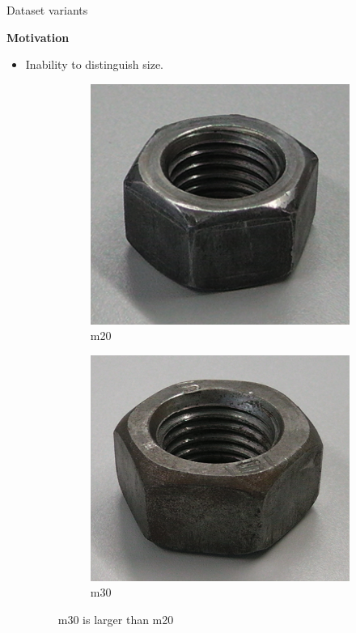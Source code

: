 \documentclass{beamer}
\begin{document}
\begin{frame}{Dataset variants}
\label{slide:motivvariants}

	\textbf{Motivation}
	\begin{small}
	
		\begin{itemize}
			\item Inability to distinguish size.
				\begin{figure}
				\centering
				\begin{subfigure}{.2\textwidth}
  					\centering
  					\includegraphics[width=.35\linewidth]{images/M20}
  					\caption{m20 \cite{github_robocup@work}}
  					\label{Fig:size1}
				\end{subfigure}%
				\begin{subfigure}{.2\textwidth}
  					\centering
  					\includegraphics[width=.35\linewidth]{images/M30}
  					\caption{m30 \cite{github_robocup@work}}
  					\label{Fig:size2}
				\end{subfigure}%
				\caption{m30 is larger than m20}
				\label{Fig:size}
				\end{figure}
				

\end{itemize}
\end{small}
\end{frame}
\end{document}

